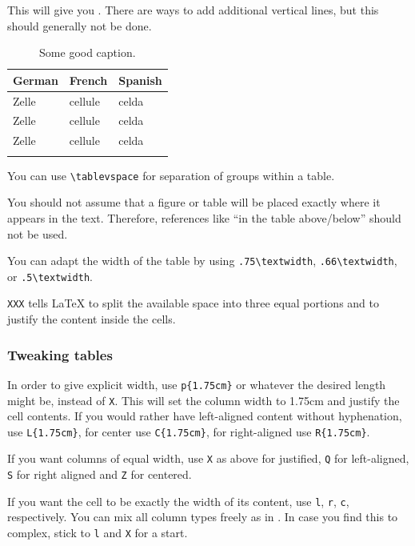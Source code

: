 This will give you  . There are ways to add additional vertical lines, but this should generally not be done. 

\begin{table}[h]
  \begin{tabularx}{\textwidth}{XXX}
    \lsptoprule
    German  & French  & Spanish \\
    \midrule
    Zelle   & cellule & celda    \\
    Zelle   & cellule & celda    \\
    Zelle   & cellule & celda    \\
    \lspbottomrule
  \end{tabularx}
  \caption{Some good caption.}
  \label{tab:chapterhandle:keytotable}
\end{table}

You can use \verb+\tablevspace+ for separation of groups within a table. 

You should not assume that a figure or table will be placed exactly where it appears in the text. Therefore, references like ``in the table above/below'' should not be used. 

You can adapt the width of the table by using \verb+.75\textwidth+,  \verb+.66\textwidth+, or \verb+.5\textwidth+.

\verb+XXX+ tells \LaTeX\xspace to split the available space into three equal portions and to justify the content inside the cells. 

\subsubsection{Tweaking tables}
In order to give explicit width, use \verb+p{1.75cm}+ or whatever the desired length might be, instead of \verb+X+. 
This will set the column width to 1.75cm and justify the cell contents. If you would rather have left-aligned content without hyphenation, use \verb+L{1.75cm}+, for center use \verb+C{1.75cm}+, for right-aligned use \verb+R{1.75cm}+.

If you want columns of equal width, use \verb+X+ as above for justified, \verb+Q+ for left-aligned, \verb+S+ for right aligned and \verb+Z+ for centered.

If you want the cell to be exactly the width of its content, use \verb+l+, \verb+r+, \verb+c+, respectively. You can mix all column types freely as in . In case you find this to complex, stick to \verb+l+ and \verb+X+ for a start.

